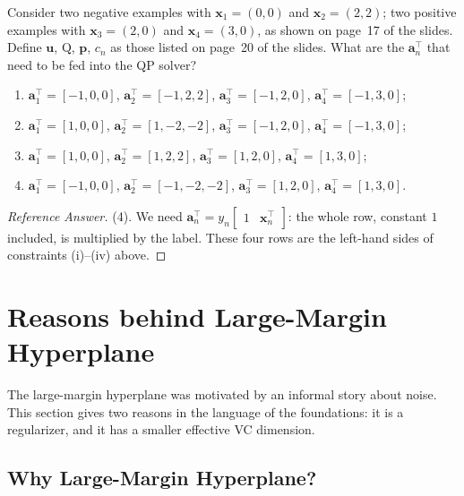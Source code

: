 \begin{exercise}
    Consider two negative examples with \(\bm{x}_1 = (0, 0)\) and \(\bm{x}_2
    = (2, 2)\); two positive examples with \(\bm{x}_3 = (2, 0)\) and
    \(\bm{x}_4 = (3, 0)\), as shown on page~17 of the slides. Define
    \(\bm{u}\), \(\mathrm{Q}\), \(\bm{p}\), \(c_n\) as those listed on
    page~20 of the slides. What are the \(\bm{a}_n^\top\) that need to be fed
    into the QP solver?
    \begin{enumerate}[(1)]
        \item \(\bm{a}_1^\top = [-1, 0, 0]\), \(\bm{a}_2^\top = [-1, 2,
            2]\), \(\bm{a}_3^\top = [-1, 2, 0]\), \(\bm{a}_4^\top = [-1, 3,
            0]\);
        \item \(\bm{a}_1^\top = [1, 0, 0]\), \(\bm{a}_2^\top = [1, -2,
            -2]\), \(\bm{a}_3^\top = [-1, 2, 0]\), \(\bm{a}_4^\top = [-1, 3,
            0]\);
        \item \(\bm{a}_1^\top = [1, 0, 0]\), \(\bm{a}_2^\top = [1, 2, 2]\),
            \(\bm{a}_3^\top = [1, 2, 0]\), \(\bm{a}_4^\top = [1, 3, 0]\);
        \item \(\bm{a}_1^\top = [-1, 0, 0]\), \(\bm{a}_2^\top = [-1, -2,
            -2]\), \(\bm{a}_3^\top = [1, 2, 0]\), \(\bm{a}_4^\top = [1, 3,
            0]\).
    \end{enumerate}
\end{exercise}

\begin{proof}[Reference Answer]
    (4). We need \(\bm{a}_n^\top = y_n \begin{bmatrix} 1 & \bm{x}_n^\top
    \end{bmatrix}\): the whole row, constant \(1\) included, is multiplied by
    the label. These four rows are the left-hand sides of constraints
    (i)--(iv) above.
\end{proof}

\section{Reasons behind Large-Margin Hyperplane}\label{sec:why-large-margin}


The large-margin hyperplane was motivated by an informal story about noise.
This section gives two reasons in the language of the foundations: it is a
regularizer, and it has a smaller effective VC dimension.

\subsection{Why Large-Margin Hyperplane?}

